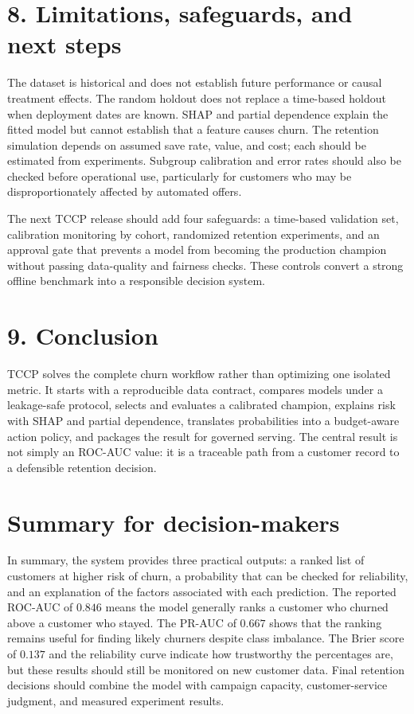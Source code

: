 \documentclass[9pt]{article}
\begin{document}
\section*{8. Limitations, safeguards, and next steps}
The dataset is historical and does not establish future performance or causal treatment effects. The random holdout does not replace a time-based holdout when deployment dates are known. SHAP and partial dependence explain the fitted model but cannot establish that a feature causes churn. The retention simulation depends on assumed save rate, value, and cost; each should be estimated from experiments. Subgroup calibration and error rates should also be checked before operational use, particularly for customers who may be disproportionately affected by automated offers.

The next TCCP release should add four safeguards: a time-based validation set, calibration monitoring by cohort, randomized retention experiments, and an approval gate that prevents a model from becoming the production champion without passing data-quality and fairness checks. These controls convert a strong offline benchmark into a responsible decision system.

\section*{9. Conclusion}
TCCP solves the complete churn workflow rather than optimizing one isolated metric. It starts with a reproducible data contract, compares models under a leakage-safe protocol, selects and evaluates a calibrated champion, explains risk with SHAP and partial dependence, translates probabilities into a budget-aware action policy, and packages the result for governed serving. The central result is not simply an ROC-AUC value: it is a traceable path from a customer record to a defensible retention decision.

\section*{Summary for decision-makers}
In summary, the system provides three practical outputs: a ranked list of customers at higher risk of churn, a probability that can be checked for reliability, and an explanation of the factors associated with each prediction. The reported ROC-AUC of $0.846$ means the model generally ranks a customer who churned above a customer who stayed. The PR-AUC of $0.667$ shows that the ranking remains useful for finding likely churners despite class imbalance. The Brier score of $0.137$ and the reliability curve indicate how trustworthy the percentages are, but these results should still be monitored on new customer data. Final retention decisions should combine the model with campaign capacity, customer-service judgment, and measured experiment results.
\end{document}
